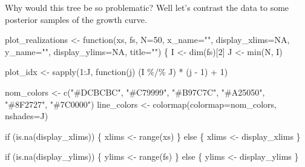 \documentclass[
  letterpaper,
  DIV=11,
  numbers=noendperiod]{scrartcl}
\newenvironment{Shaded}{\begin{snugshade}}{\end{snugshade}}
\newcommand{\AttributeTok}[1]{\textcolor[rgb]{0.40,0.45,0.13}{#1}}
\newcommand{\ConstantTok}[1]{\textcolor[rgb]{0.56,0.35,0.01}{#1}}
\newcommand{\ControlFlowTok}[1]{\textcolor[rgb]{0.00,0.23,0.31}{#1}}
\newcommand{\DecValTok}[1]{\textcolor[rgb]{0.68,0.00,0.00}{#1}}
\newcommand{\FunctionTok}[1]{\textcolor[rgb]{0.28,0.35,0.67}{#1}}
\newcommand{\NormalTok}[1]{\textcolor[rgb]{0.00,0.23,0.31}{#1}}
\newcommand{\OtherTok}[1]{\textcolor[rgb]{0.00,0.23,0.31}{#1}}
\newcommand{\SpecialCharTok}[1]{\textcolor[rgb]{0.37,0.37,0.37}{#1}}
\newcommand{\StringTok}[1]{\textcolor[rgb]{0.13,0.47,0.30}{#1}}
\begin{document}
Why would this tree be so problematic? Well let's contrast the data to
some posterior samples of the growth curve.

\begin{Shaded}
\begin{Highlighting}[]
\NormalTok{plot\_realizations }\OtherTok{\textless{}{-}} \ControlFlowTok{function}\NormalTok{(xs, fs, }\AttributeTok{N=}\DecValTok{50}\NormalTok{,}
                              \AttributeTok{x\_name=}\StringTok{""}\NormalTok{, }\AttributeTok{display\_xlims=}\ConstantTok{NA}\NormalTok{,}
                              \AttributeTok{y\_name=}\StringTok{""}\NormalTok{, }\AttributeTok{display\_ylims=}\ConstantTok{NA}\NormalTok{,}
                              \AttributeTok{title=}\StringTok{""}\NormalTok{) \{}
\NormalTok{  I }\OtherTok{\textless{}{-}} \FunctionTok{dim}\NormalTok{(fs)[}\DecValTok{2}\NormalTok{]}
\NormalTok{  J }\OtherTok{\textless{}{-}} \FunctionTok{min}\NormalTok{(N, I)}

\NormalTok{  plot\_idx }\OtherTok{\textless{}{-}} \FunctionTok{sapply}\NormalTok{(}\DecValTok{1}\SpecialCharTok{:}\NormalTok{J, }\ControlFlowTok{function}\NormalTok{(j) (I }\SpecialCharTok{\%/\%}\NormalTok{ J) }\SpecialCharTok{*}\NormalTok{ (j }\SpecialCharTok{{-}} \DecValTok{1}\NormalTok{) }\SpecialCharTok{+} \DecValTok{1}\NormalTok{)}

\NormalTok{  nom\_colors }\OtherTok{\textless{}{-}} \FunctionTok{c}\NormalTok{(}\StringTok{"\#DCBCBC"}\NormalTok{, }\StringTok{"\#C79999"}\NormalTok{, }\StringTok{"\#B97C7C"}\NormalTok{,}
                  \StringTok{"\#A25050"}\NormalTok{, }\StringTok{"\#8F2727"}\NormalTok{, }\StringTok{"\#7C0000"}\NormalTok{)}
\NormalTok{  line\_colors }\OtherTok{\textless{}{-}} \FunctionTok{colormap}\NormalTok{(}\AttributeTok{colormap=}\NormalTok{nom\_colors, }\AttributeTok{nshades=}\NormalTok{J)}

  \ControlFlowTok{if}\NormalTok{ (}\FunctionTok{is.na}\NormalTok{(display\_xlims)) \{}
\NormalTok{    xlims }\OtherTok{\textless{}{-}} \FunctionTok{range}\NormalTok{(xs)}
\NormalTok{  \} }\ControlFlowTok{else}\NormalTok{ \{}
\NormalTok{    xlims }\OtherTok{\textless{}{-}}\NormalTok{ display\_xlims}
\NormalTok{  \}}

  \ControlFlowTok{if}\NormalTok{ (}\FunctionTok{is.na}\NormalTok{(display\_ylims)) \{}
\NormalTok{    ylims }\OtherTok{\textless{}{-}} \FunctionTok{range}\NormalTok{(fs)}
\NormalTok{  \} }\ControlFlowTok{else}\NormalTok{ \{}
\NormalTok{    ylims }\OtherTok{\textless{}{-}}\NormalTok{ display\_ylims}
\NormalTok{  \}}


\end{Highlighting}
\end{Shaded}
\end{document}

